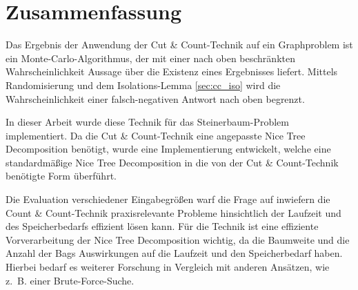 \chapter{Zusammenfassung}
\label{c:summary}
Das Ergebnis der Anwendung der Cut \& Count-Technik auf ein Graphproblem ist ein Monte-Carlo-Algorithmus, der mit einer nach oben beschränkten Wahrscheinlichkeit Aussage über die Existenz eines Ergebnisses liefert. Mittels Randomisierung und dem Isolations-Lemma \ref{sec:cc_iso} wird die Wahrscheinlichkeit einer falsch-negativen Antwort nach oben begrenzt. 

In dieser Arbeit wurde diese Technik für das Steinerbaum-Problem implementiert. Da die Cut \& Count-Technik eine angepasste Nice Tree Decomposition benötigt, wurde eine Implementierung entwickelt, welche eine standardmäßige Nice Tree Decomposition in die von der Cut \& Count-Technik benötigte Form überführt.

Die Evaluation verschiedener Eingabegrößen warf die Frage auf inwiefern die Count \& Count-Technik praxisrelevante Probleme hinsichtlich der Laufzeit und des Speicherbedarfs effizient lösen kann. 
Für die Technik ist eine effiziente Vorverarbeitung der Nice Tree Decomposition wichtig, da die Baumweite und die Anzahl der Bags Auswirkungen auf die Laufzeit und den Speicherbedarf haben.
Hierbei bedarf es weiterer Forschung in Vergleich mit anderen Ansätzen, wie z.~B. einer Brute-Force-Suche.


